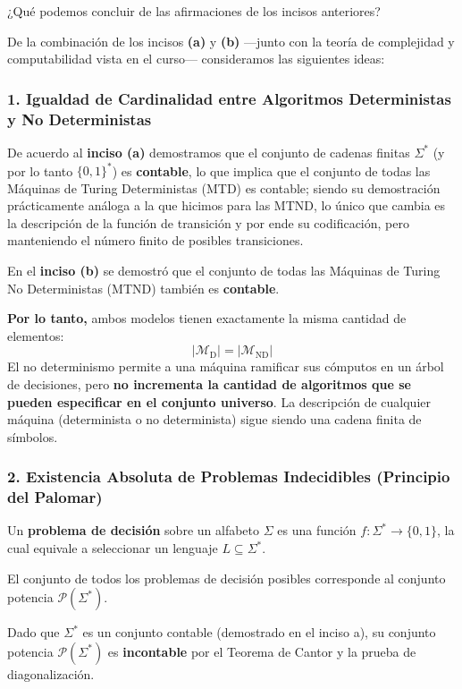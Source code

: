 \begin{tcolorbox}[enunciado]
    ¿Qué podemos concluir de las afirmaciones de los incisos anteriores?
\end{tcolorbox}

De la combinación de los incisos \textbf{(a)} y \textbf{(b)} —junto con la teoría de complejidad y computabilidad vista en el curso— consideramos las siguientes ideas:

\subsubsection*{1. Igualdad de Cardinalidad entre Algoritmos Deterministas y No Deterministas}

De acuerdo al \textbf{inciso (a)} demostramos que el conjunto de cadenas finitas $\Sigma^*$ (y por lo tanto $\{0, 1\}^*$) es \textbf{contable}, lo que implica que el conjunto de todas las Máquinas de Turing Deterministas (MTD) es contable; siendo su demostración prácticamente análoga a la que hicimos para las MTND, lo único que cambia es la descripción de la función de transición y por ende su codificación, pero manteniendo el número finito de posibles transiciones.

En el \textbf{inciso (b)} se demostró que el conjunto de todas las Máquinas de Turing No Deterministas (MTND) también es \textbf{contable}.

\textbf{Por lo tanto,} ambos modelos tienen exactamente la misma cantidad de elementos:
\[
    |\mathcal{M}_{\text{D}}| = |\mathcal{M}_{\text{ND}}|
\]
El no determinismo permite a una máquina ramificar sus cómputos en un árbol de decisiones, pero \textbf{no incrementa la cantidad de algoritmos que se pueden especificar en el conjunto universo}. La descripción de cualquier máquina (determinista o no determinista) sigue siendo una cadena finita de símbolos.

\subsubsection*{2. Existencia Absoluta de Problemas Indecidibles (Principio del Palomar)}

Un \textbf{problema de decisión} sobre un alfabeto $\Sigma$ es una función $f : \Sigma^* \to \{0, 1\}$, la cual equivale a seleccionar un lenguaje $L \subseteq \Sigma^*$.

El conjunto de todos los problemas de decisión posibles corresponde al conjunto potencia $\mathcal{P}(\Sigma^*)$.

Dado que $\Sigma^*$ es un conjunto contable (demostrado en el inciso a), su conjunto potencia $\mathcal{P}(\Sigma^*)$ es \textbf{incontable} por el Teorema de Cantor y la prueba de diagonalización.

